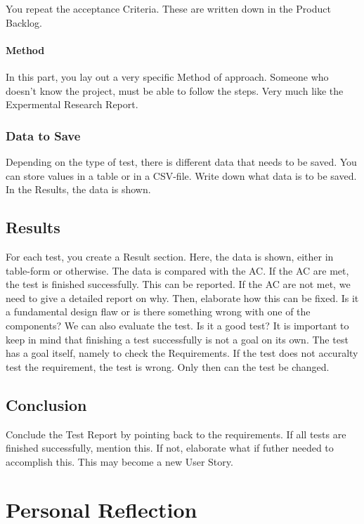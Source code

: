 \documentclass[10pt]{report}
\begin{document}
You repeat the acceptance Criteria. These are written down in the Product Backlog.

\paragraph{Method}

In this part, you lay out a very specific Method of approach. Someone who doesn't know the project, must be able to follow the steps. Very much like the Expermental Research Report.

\subsubsection{Data to Save}

Depending on the type of test, there is different data that needs to be saved. You can store values in a table or in a CSV-file. Write down what data is to be saved. In the Results, the data is shown.

\subsection{Results}

For each test, you create a Result section. Here, the data is shown, either in table-form or otherwise. The data is compared with the AC. If the AC are met, the test is finished successfully. This can be reported. If the AC are not met, we need to give a detailed report on why. Then, elaborate how this can be fixed. Is it a fundamental design flaw or is there something wrong with one of the components? We can also evaluate the test. Is it a good test? It is important to keep in mind that finishing a test successfully is not a goal on its own. The test has a goal itself, namely to check the Requirements. If the test does not accuralty test the requirement, the test is wrong. Only then can the test be changed.

\subsection{Conclusion}

Conclude the Test Report by pointing back to the requirements. If all tests are finished successfully, mention this. If not, elaborate what if futher needed to accomplish this. This may become a new User Story.

\newpage

\section{Personal Reflection}
\end{document}
